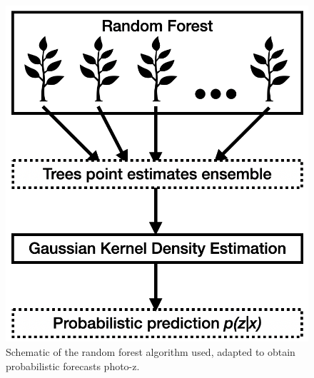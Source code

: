 \documentclass[fleqn,usenatbib]{mnras}
\begin{document}


\begin{figure}
    \centering
    \includegraphics[width=0.95\linewidth]{images/qrf.png}
    \caption{Schematic of the random forest algorithm used, adapted to obtain probabilistic forecasts photo-z.}
    \label{fig:qrf_scheme}
\end{figure}
\end{document}
